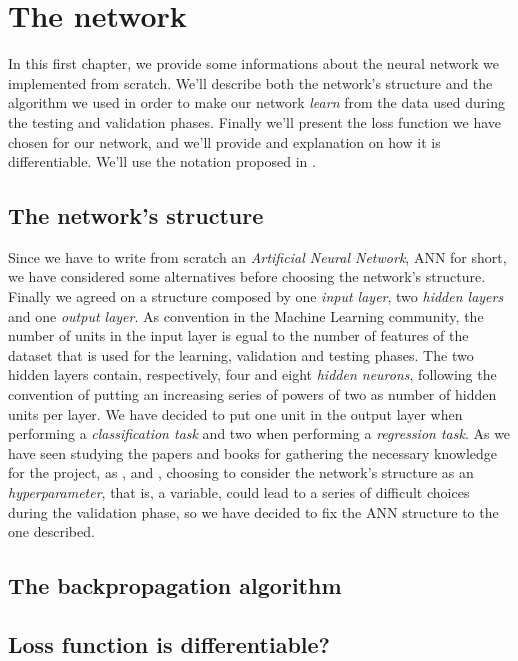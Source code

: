 \chapter{The network} %
\label{cha:the_network}
	\noindent
	In this first chapter, we provide some informations about the neural network we implemented from scratch.
	We'll describe both the network's structure and the algorithm we used in order to make our network
	\textit{learn} from the data used during the testing and validation phases. Finally we'll present the loss
	function we have chosen for our network, and we'll provide and explanation on how it is differentiable. We'll
	use the notation proposed in \cite{Goodfellow-et-al-2016}.

	\section{The network's structure} %
	\label{sec:the_network_s_structure}
		\noindent
		Since we have to write from scratch an \textit{Artificial Neural Network}, ANN for short, we have
		considered some alternatives before choosing the network's structure. Finally we agreed on a structure
		composed by one \textit{input layer}, two \textit{hidden layers} and one \textit{output layer}. As
		convention in the Machine Learning community, the number of units in the input layer is egual to the number
		of features of the dataset that is used for the learning, validation and testing phases. The two
		hidden layers contain, respectively, four and eight \textit{hidden neurons}, following the convention of
		putting an increasing series of powers of two as number of hidden units per layer. We have decided to put
		one unit in the output layer when performing a \textit{classification task} and two when performing a
		\textit{regression task}. As we have seen studying the papers and books for gathering the necessary
		knowledge for the project, as \cite{Goodfellow-et-al-2016}, \cite{haykin2009neural} and
		\cite{mitchell1997machine}, choosing to consider the network's structure as an \textit{hyperparameter},
		that is, a variable, could lead to a series of difficult choices during the validation phase, so we have
		decided to fix the ANN structure to the one described.

	\section{The backpropagation algorithm} %
	\label{sec:the_backpropagation_algorithm}
		\noindent

	\section{Loss function is differentiable?} %
	\label{sec:loss_function_is_differentiable_}


